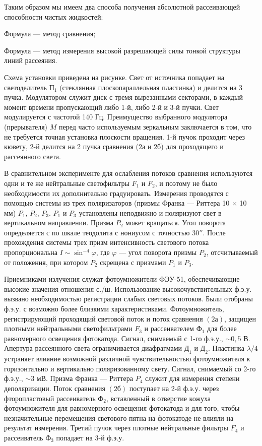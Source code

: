 Таким образом мы имеем два способа получения абсолютной рассеивающей способности чистых жидкостей:

Формула  --- метод сравнения;

Формула  --- метод измерения высокой разрешающей силы тонкой структуры
линий рассеяния.



Схема установки приведена на рисунке. Свет от источника попадает
на светоделитель $П_1$ (стеклянная плоскопараллельная пластинка)
и делится на 3 пучка. Модулятором служит диск с тремя вырезанными
секторами, в каждый момент времени пропускающий либо 1-й, либо
2-й и 3-й пучки. Свет модулируется с частотой 140 Гц.
Преимущество выбранного модулятора (прерывателя) $M$ перед часто
используемым зеркальным заключается в том, что не требуется
точная установка плоскости вращения. 1-й пучок проходит через
кювету, 2-й делится на 2 пучка сравнения ($2а$ и $2б$) для
проходящего и рассеянного света.

В сравнительном эксперименте для ослабления потоков сравнения
используются одни и те же нейтральные светофильтры $F_1$ и $F_2$,
и поэтому не было необходимости их дополнительно градуировать.
Измерения проводятся с помощью системы из трех поляризаторов
(призмы Франка --- Риттера 10 $\times$ 10 мм) $P_1$, $P_2$,
$P_3$. $P_1$ и $P_3$ установлены неподвижно и поляризуют свет в
вертикальном направлении. Призма $P_2$ может вращаться. Угол
поворота определяется с по шкале теодолита с нониусом с точностью
30$''$. После прохождения системы трех призм интенсивность
светового потока пропорциональна $I\sim\sin^{-4}\varphi$, где
$\varphi$ --- угол поворота призмы $P_2$, отсчитываемый от
положения, при котором $P_2$ скрещена с призмами $P_1$ и $P_3$.


Приемниками излучения служат фотоумножители ФЭУ-51,
обеспечивающие высокие значения отношения с./ш. Использование
высокочувствительных ф.э.у. вызвано необходимостью регистрации
слабых световых потоков. Были отобраны ф.э.у. с возможно более
близкими характеристиками. Фотоумножитель, регистрирующий
проходящий световой поток и поток сравнения $(2а)$, защищен
плотными нейтральными светофильтрами $F_3$ и рассеивателем $Ф_1$
для более равномерного освещения фотокатода. Сигнал, снимаемый с
1-го ф.э.у., $\sim0,5$ В. Апертура рассеянного света
ограничивается диафрагмами $Д_1$ и $Д_2$. Пластинка $\lambda/4$
устраняет влияние возможной различной чувствительностью
фотоумножителя к горизонтально и вертикально поляризованному
свету. Сигнал, снимаемый со 2-го ф.э.у., $\sim3$ мВ. Призма
Франка --- Риттера $P_4$ служит для измерения степени
деполяризации. Поток сравнения $(2б)$ поступает на 2-й ф.э.у.
через фторопластовый рассеиватель $Ф_2$, вставленный в отверстие
кожуха фотоумножителя для равномерного освещения фотокатода и для
того, чтобы незначительные перемещения светового пятна на
фотокатоде не влияли на результат измерения. Третий пучок через
плотные нейтральные фильтры $F_4$ и рассеиватель $Ф_3$ попадает
на 3-й ф.э.у.

